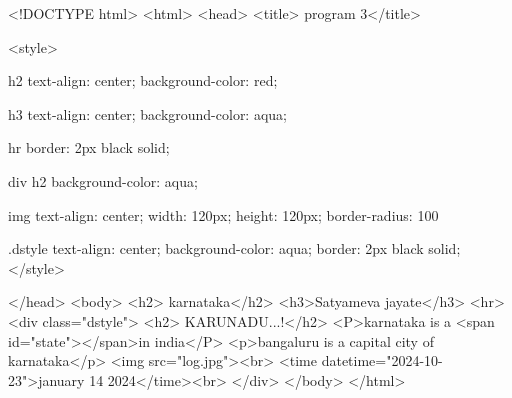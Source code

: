 <!DOCTYPE html>
<html>
    <head>
<title> program 3</title>

<style>

h2{
    text-align: center;
    background-color: red;
}

h3{
    text-align: center;
    background-color: aqua;
}

hr{
    border: 2px black solid;
}

div h2{
    background-color: aqua;
}

img{
    text-align: center;
    width: 120px;
    height: 120px;
    border-radius: 100%
}

.dstyle{
    text-align: center;
    background-color: aqua;
    border: 2px black solid;
}
</style>


</head>
<body>
<h2> karnataka</h2>
<h3>Satyameva jayate</h3>
<hr>
<div class="dstyle">
    <h2> KARUNADU...!</h2>
    <P>karnataka is a <span id="state"></span>in india</P> 
    <p>bangaluru is a capital city of karnataka</p>
    <img src="log.jpg"><br>
    <time datetime="2024-10-23">january 14 2024</time><br>
    </div>
    </body>
    </html>

